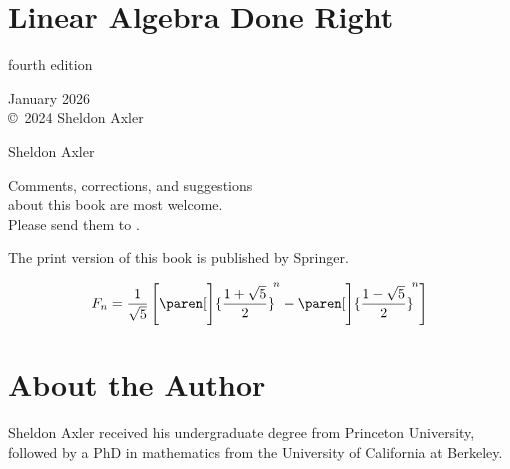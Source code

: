 
\setcounter{secnumdepth}{-1}


\setcounter{page}{0}

\chapter{Linear Algebra Done Right}

\thispagestyle{empty}

\begin{center}

fourth edition

 January 2026
\\\copyright\ 2024 Sheldon Axler

\vfill

{\huge
Sheldon Axler}

\vfill

Comments, corrections, and suggestions\\about this book are most welcome.\\Please send them to .

\vfill

The print version of this book is published by Springer.

\bigskip

\end{center}

\CrCom


{

\[
F_n = \frac{1}{\sqrt{5}} \, \Biggl[ \paren[\Bigg]{ \frac{1 + \sqrt{5}}{2} }^{\!n}
-\paren[\Bigg]{ \frac{1 - \sqrt{5}}{2} }^{\!n} \Biggr]
\]}


\setcounter{page}{4}

\chapter{About the Author}

Sheldon Axler received his undergraduate degree from Princeton University, followed by a PhD in mathematics from the University of California at Berkeley.


